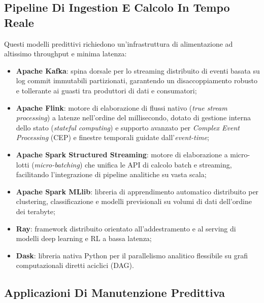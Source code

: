 \documentclass[11pt, a4paper]{article}
\begin{document}
\subsection{Pipeline Di Ingestion E Calcolo In Tempo Reale}

Questi modelli predittivi richiedono un'infrastruttura di alimentazione ad altissimo throughput e minima latenza:
\begin{itemize}
    \item \textbf{Apache Kafka}: spina dorsale per lo streaming distribuito di eventi basata su log commit immutabili partizionati, garantendo un disaccoppiamento robusto e tollerante ai guasti tra produttori di dati e consumatori;
    \item \textbf{Apache Flink}: motore di elaborazione di flussi nativo (\emph{true stream processing}) a latenze nell'ordine del millisecondo, dotato di gestione interna dello stato (\emph{stateful computing}) e supporto avanzato per \emph{Complex Event Processing} (CEP) e finestre temporali guidate dall'\emph{event-time};
    \item \textbf{Apache Spark Structured Streaming}: motore di elaborazione a micro-lotti (\emph{micro-batching}) che unifica le API di calcolo batch e streaming, facilitando l'integrazione di pipeline analitiche su vasta scala;
    \item \textbf{Apache Spark MLlib}: libreria di apprendimento automatico distribuito per clustering, classificazione e modelli previsionali su volumi di dati dell'ordine dei terabyte;
    \item \textbf{Ray}: framework distribuito orientato all'addestramento e al serving di modelli deep learning e RL a bassa latenza;
    \item \textbf{Dask}: libreria nativa Python per il parallelismo analitico flessibile su grafi computazionali diretti aciclici (DAG).
\end{itemize}


\subsection{Applicazioni Di Manutenzione Predittiva}
\end{document}
